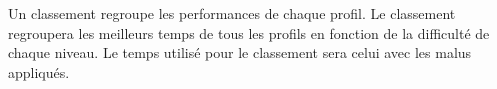 {
    Un classement regroupe les performances de chaque profil.
}
{
    Le classement regroupera les meilleurs temps de tous les profils en fonction de la difficulté de chaque niveau. Le temps utilisé pour le classement sera celui avec les malus appliqués.
}